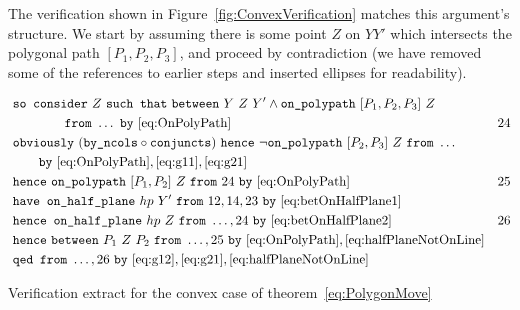 The verification shown in Figure~\ref{fig:ConvexVerification} matches this argument's structure.  We start by assuming there is some point $Z$ on $YY'$ which intersects the polygonal path $[P_1,P_2,P_3]$, and proceed by contradiction (we have removed some of the references to earlier steps and inserted ellipses for readability). 

\begin{boxedfigure}
\small
\begin{align*}
&\code{so consider}\ Z\ \code{such that}\ \between{Y}{Z}{Y'} \wedge \code{on\_polypath}\ [P_1,P_2,P_3]\ Z\\\
&\qquad\qquad\code{from}\ \ldots\ \code{by}\ \eqref{eq:OnPolyPath} & 24\\
&\code{obviously}\ (\code{by\_ncols}\circ\code{conjuncts})\ \code{hence}\ \neg\code{on\_polypath}\ [P_2,P_3]\ Z\ \code{from}\ \ldots\\
&\qquad\code{by}\ \eqref{eq:OnPolyPath},\eqref{eq:g11},\eqref{eq:g21}\\
&\code{hence}\ \code{on\_polypath}\ [P_1,P_2]\ Z\ \code{from}\ 24\ \code{by}\ \eqref{eq:OnPolyPath}&25\\
&\code{have on\_half\_plane}\ hp\ Y'\ \code{from}\ 12,14,23\ \code{by}\ \eqref{eq:betOnHalfPlane1}\\
&\code{hence on\_half\_plane}\ hp\ Z\ \code{from}\ \ldots,24\ \code{by}\ \eqref{eq:betOnHalfPlane2} & 26\\
&\code{hence}\ \between{P_1}{Z}{P_2}\ \code{from}\ \ldots,25\ \code{by}\ \eqref{eq:OnPolyPath},\eqref{eq:halfPlaneNotOnLine}\\
&\code{qed from}\ \ldots,26\ \code{by}\ \eqref{eq:g12},\eqref{eq:g21},\eqref{eq:halfPlaneNotOnLine}
\end{align*}
\caption{Verification extract for the convex case of theorem~\ref{eq:PolygonMove}}
\label{fig:ConvexVerification}
\end{boxedfigure}

